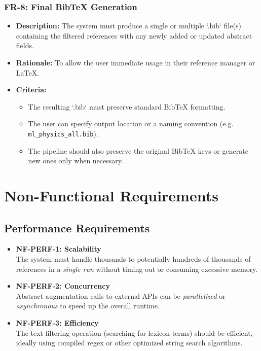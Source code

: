 \documentclass[12pt]{article}
\begin{document}
\subsubsection{FR-8: Final BibTeX Generation}
\begin{itemize}
  \item \textbf{Description:} The system must produce a single or multiple `.bib` file(s) containing the filtered references with any newly added or updated abstract fields. 
  \item \textbf{Rationale:} To allow the user immediate usage in their reference manager or \LaTeX. 
  \item \textbf{Criteria:}
    \begin{itemize}
      \item The resulting `.bib` must preserve standard BibTeX formatting.
      \item The user can specify output location or a naming convention (e.g. \verb|ml_physics_all.bib|).
      \item The pipeline should also preserve the original BibTeX keys or generate new ones only when necessary.
    \end{itemize}
\end{itemize}


\newpage

\section{Non-Functional Requirements}

\subsection{Performance Requirements}
\begin{itemize}
  \item \textbf{NF-PERF-1: Scalability} \\
  The system must handle thousands to potentially hundreds of thousands of references in a \emph{single run} without timing out or consuming excessive memory. 
  \item \textbf{NF-PERF-2: Concurrency} \\
  Abstract augmentation calls to external APIs can be \emph{parallelized} or \emph{asynchronous} to speed up the overall runtime.
  \item \textbf{NF-PERF-3: Efficiency} \\
  The text filtering operation (searching for lexicon terms) should be efficient, ideally using compiled regex or other optimized string search algorithms. 
\end{itemize}
\end{document}
